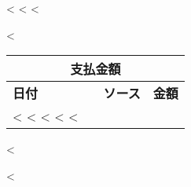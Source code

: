 \begin{CJK}{UTF8}{arialuni}
<%
\vspace{0.3cm}
<%
<%

\vspace{1.5cm}

<%
\begin{tabular}{@{}lllr@{}}
  \multicolumn{4}{c}{\textbf{支払金額}} \\
  \hline
  \textbf{日付} & & \textbf{ソース} & \textbf{金額} \\
<%
<%
  <%
<%
<%
\end{tabular}
<%

\vfill
<%
\end{CJK}    


